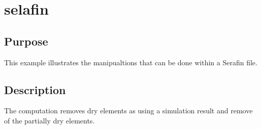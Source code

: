 \chapter{selafin}
%
%
\section{Purpose}
This example illustrates the manipualtions that can be done within a Serafin
file.
%
\section{Description}
The computation removes dry elements as using a  simulation result
and remove of the partially dry elements.

%
%
%
%
%
%
%
%
